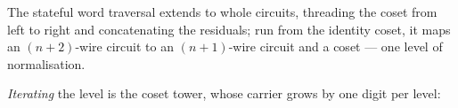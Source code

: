 \begin{code}%
\>[0]\AgdaSpace{}%
\AgdaSymbol{:}\AgdaSpace{}%
\AgdaSpace{}%
\AgdaSpace{}%
\AgdaSpace{}%
\AgdaSpace{}%
\AgdaSpace{}%
\AgdaSymbol{(}\AgdaSpace{}%
\AgdaOperator{\AgdaInductiveConstructor{,}}\AgdaSpace{}%
\AgdaSymbol{)}\AgdaSpace{}%
\AgdaSymbol{=}\AgdaSpace{}%
\AgdaSpace{}%
\AgdaSpace{}%
\AgdaSpace{}%
\AgdaSpace{}%
\AgdaOperator{\AgdaFunction{[}}\AgdaSpace{}%
\AgdaSpace{}%
\AgdaOperator{\AgdaFunction{]ᶜ}}\AgdaSpace{}%
\AgdaSpace{}%
\AgdaOperator{\AgdaInductiveConstructor{[}}\AgdaSpace{}%
\AgdaSpace{}%
\AgdaOperator{\AgdaInductiveConstructor{]ʷ}}\AgdaSpace{}%
\AgdaSpace{}%
\AgdaSpace{}%
\AgdaSpace{}%
\AgdaSpace{}%
\AgdaOperator{\AgdaFunction{[}}\AgdaSpace{}%
\AgdaSpace{}%
\AgdaOperator{\AgdaFunction{]ᶜ}}\<%
\end{code}
\begin{code}[hide]%
\>[0]\AgdaSpace{}%
\AgdaSymbol{=}\AgdaSpace{}%
\<%
\end{code}

The stateful word traversal  extends
 to whole circuits, threading the coset from left to right and
concatenating the residuals; run from the identity coset, it maps an
$(n{+}2)$-wire circuit to an $(n{+}1)$-wire circuit and a coset --- one
level of normalisation.

\emph{Iterating} the level is the coset tower, whose carrier grows by
one digit per level:

\begin{center}
\begin{minipage}[c]{0.56\linewidth}
\begingroup\setlength{\mathindent}{0pt}
\begin{code}%
\>[0]\AgdaSpace{}%
\AgdaSymbol{:}\AgdaSpace{}%
\AgdaSpace{}%
\AgdaSpace{}%
\<%
\\
\>[0]\AgdaSpace{}%
%
\>[11]\AgdaSymbol{=}\AgdaSpace{}%
\<%
\\
\>[0]\AgdaSpace{}%
\AgdaSymbol{(}\AgdaSpace{}%
\AgdaSymbol{)}\AgdaSpace{}%
\AgdaSymbol{=}\AgdaSpace{}%
\AgdaSpace{}%
\AgdaSpace{}%
\AgdaSpace{}%
\AgdaSpace{}%
%
\>[26]\<%
\end{code}
\endgroup
\end{minipage}\hspace{2.5em}%
\begin{minipage}[c]{0.16\linewidth}\centering
\end{minipage}
\end{center}


